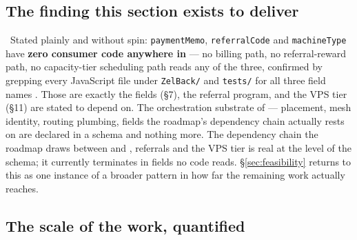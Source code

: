 \subsection{The finding this section exists to deliver}
\label{sec:finding}

\inprogress\ Stated plainly and without spin: \texttt{paymentMemo}, \texttt{referralCode} and
\texttt{machineType} have \textbf{zero consumer code anywhere in \FluxOS} — no billing path, no
referral-reward path, no
capacity-tier scheduling path reads any of the three, confirmed by grepping every JavaScript file
under \texttt{ZelBack/} and \texttt{tests/} for all three field names
.
Those are exactly the fields \PNR (\S7), the referral program, and the VPS tier (\S11) are stated to
depend on. The orchestration substrate of  — placement, mesh identity, routing plumbing,
fields the roadmap's dependency chain actually rests on are declared in a schema and nothing more.
The dependency chain the roadmap draws between  and \PNR, referrals and the VPS tier is
real at the level of the schema; it currently terminates in fields no code reads. \S\ref{sec:feasibility} returns to
this as one instance of a broader pattern in how far the remaining work actually reaches.

\subsection{The scale of the work, quantified}
\label{sec:appspec-v9-scale}

